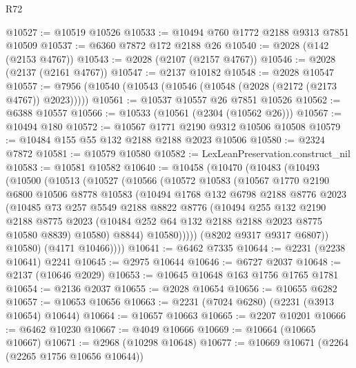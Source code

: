 \begin{lexlean}{R72}
\begin{coremodule}
@10527 := @10519 @10526
@10533 := @10494 @760 @1772 @2188 @9313 @7851 @10509
@10537 := @6360 @7872 @172 @2188 @26
@10540 := @2028 (@142 (@2153 @4767))
@10543 := @2028 (@2107 (@2157 @4767))
@10546 := @2028 (@2137 (@2161 @4767))
@10547 := @2137 @10182
@10548 := @2028 @10547
@10557 := @7956 (@10540 (@10543 (@10546 (@10548 (@2028 (@2172 (@2173 @4767)) @2023)))))
@10561 := @10537 @10557 @26 @7851 @10526
@10562 := @6388 @10557
@10566 := @10533 (@10561 (@2304 (@10562 @26)))
@10567 := @10494 @180
@10572 := @10567 @1771 @2190 @9312 @10506 @10508
@10579 := @10484 @155 @55 @132 @2188 @2188 @2023 @10506
@10580 := @2324 @7872
@10581 := @10579 @10580
@10582 := LexLeanPreservation.construct_nil
@10583 := @10581 @10582
@10640 := @10458
    (@10470
      (@10483
        (@10493
          (@10500
            (@10513
              (@10527
                (@10566
                  (@10572
                    @10583
                    (@10567
                      @1770
                      @2190
                      @6800
                      @10506
                      @8778
                      @10583
                      (@10494
                        @1768
                        @132
                        @6798
                        @2188
                        @8776
                        @2023
                        (@10485
                          @73
                          @257
                          @5549
                          @2188
                          @8822
                          @8776
                          (@10494
                            @255
                            @132
                            @2190
                            @2188
                            @8775
                            @2023
                            (@10484 @252 @64 @132 @2188 @2188 @2023 @8775 @10580 @8839)
                            @10580)
                          @8844)
                        @10580)))))
              (@8202 @9317 @9317 @6807))
            @10580)
          (@4171 @10466))))
@10641 := @6462 @7335
@10644 := @2231 (@2238 @10641) @2241
@10645 := @2975 @10644
@10646 := @6727 @2037
@10648 := @2137 (@10646 @2029)
@10653 := @10645 @10648 @163 @1756 @1765 @1781
@10654 := @2136 @2037
@10655 := @2028 @10654
@10656 := @10655 @6282
@10657 := @10653 @10656
@10663 := @2231 (@7024 @6280) (@2231 (@3913 @10654) @10644)
@10664 := @10657 @10663
@10665 := @2207 @10201
@10666 := @6462 @10230
@10667 := @4049 @10666
@10669 := @10664 (@10665 @10667)
@10671 := @2968 (@10298 @10648)
@10677 := @10669 @10671 (@2264 (@2265 @1756 @10656 @10644))

\end{coremodule}
\end{lexlean}
